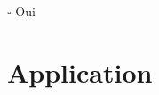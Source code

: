 \documentclass[asi]{picInsa}
\title{\CDR{}}
\author{\Julie{}, \Pierre{}} %
\begin{document}
\couvertureCDR{}
$\square$ Oui

\informationsGenerales{}


\tableofcontents

\setcounter{chapter}{0}

\chapter{Application}
\label{application}




\pageQuatriemeCouverture
\end{document}
